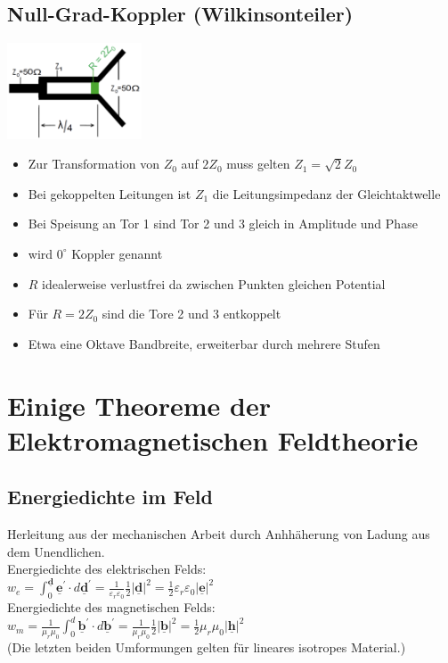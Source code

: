 \documentclass[english]{latex4ei/latex4ei_sheet}
\renewcommand{\vec}[1]{\underline{\boldsymbol{#1}}}
\begin{document}
\begin{sectionbox}
	\subsection{Null-Grad-Koppler (Wilkinsonteiler)}
	\begin{center}\includegraphics[width = 4cm]{./img/wilkinsonteiler.png}\end{center}
	\begin{itemize}
		\item Zur Transformation von $Z_0$ auf $2Z_0$ muss gelten $Z_1 = \sqrt{2}Z_0$
		\item Bei gekoppelten Leitungen ist $Z_1$ die Leitungsimpedanz der Gleichtaktwelle
		\item Bei Speisung an Tor 1 sind Tor 2 und 3 gleich in Amplitude und Phase
		\item wird $0^{\circ}$ Koppler genannt
		\item $R$ idealerweise verlustfrei da zwischen Punkten gleichen Potential
		\item Für $R = 2Z_0$ sind die Tore 2 und 3 entkoppelt
		\item Etwa eine Oktave Bandbreite, erweiterbar durch mehrere Stufen
	\end{itemize}
\end{sectionbox}

\section{Einige Theoreme der Elektromagnetischen Feldtheorie}
\begin{sectionbox}
	\subsection{Energiedichte im Feld}
	Herleitung aus der mechanischen Arbeit durch Anhhäherung von Ladung aus dem Unendlichen.\\
	Energiedichte des elektrischen Felds:\\
	$w_{e}=\int_{0}^{\vec{d}} \vec{e}^{\prime} \cdot d \vec{d}^{\prime}= \frac{1}{\varepsilon_{r} \varepsilon_{0}} \frac{1}{2}|\vec{d}|^{2}=\frac{1}{2} \varepsilon_{r} \varepsilon_{0}|\vec{e}|^{2}$\\
	Energiedichte des magnetischen Felds:\\
	$w_{m}=\frac{1}{\mu_{r} \mu_{0}} \int_{0}^{d} \vec{b}^{\prime} \cdot d \vec{b}^{\prime}=\frac{1}{\mu_{r} \mu_{0}} \frac{1}{2}|\vec{b}|^{2}= \frac{1}{2} \mu_{r} \mu_{0}|\vec{h}|^{2}$\\
	(Die letzten beiden Umformungen gelten für lineares isotropes Material.)
\end{sectionbox}
\end{document}
